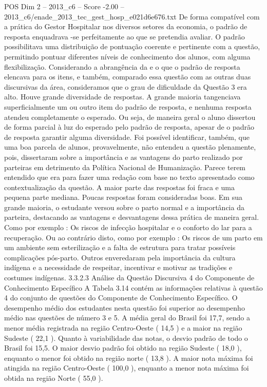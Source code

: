 \begin{textsample}{POS Dim 2 – 2013\_c6 – Score -2.00 – 2013\_c6/enade\_2013\_tec\_gest\_hosp\_e021d6e676.txt}
De forma compatível com a prática do Gestor Hospitalar nos diversos setores da economia, o padrão de resposta enquadrava -se perfeitamente ao que se pretendia avaliar.
O padrão possibilitava uma distribuição de pontuação coerente e pertinente com a questão, permitindo pontuar diferentes níveis de conhecimento dos alunos, com alguma flexibilização.
Considerando a abrangência da e o que o padrão de resposta elencava para os itens, e também, comparado essa questão com as outras duas discursivas da área, consideramos que o grau de dificuldade da Questão 3 era alto.
Houve grande diversidade de respostas.
A grande maioria tangenciava superficialmente um ou outro item do padrão de resposta, e nenhuma resposta atendeu completamente o esperado.
Ou seja, de maneira geral o aluno dissertou de forma parcial à luz do esperado pelo padrão de resposta, apesar de o padrão de resposta garantir alguma diversidade.
Foi possível identificar, também, que uma boa parcela de alunos, provavelmente, não entendeu a questão plenamente, pois, dissertaram sobre a importância e as vantagens do parto realizado por parteiras em detrimento da Política Nacional de Humanização.
Parece terem entendido que era para fazer uma redação com base no texto apresentado como contextualização da questão.
A maior parte das respostas foi fraca e uma pequena parte mediana.
Poucas respostas foram consideradas boas.
Em sua grande maioria, o estudante versou sobre o parto normal e a importância da parteira, destacando as vantagens e desvantagens dessa prática de maneira geral.
Como por exemplo : Os riscos de infecção hospitalar e o conforto do lar para a recuperação.
Ou ao contrário disto, como por exemplo : Os riscos de um parto em um ambiente sem esterilização e a falta de estrutura para tratar possíveis complicações pós-parto.
Outros enveredaram pela importância da cultura indígena e a necessidade de respeitar, incentivar e motivar as tradições e costumes indígenas. 3.3.2.3 Análise da Questão Discursiva 4 do Componente de Conhecimento Específico A Tabela 3.14 contém as informações relativas à questão 4 do conjunto de questões do Componente de Conhecimento Específico.
O desempenho médio dos estudantes nesta questão foi superior ao desempenho médio nas questões de número 3 e 5.
A média geral do Brasil foi 17,7, sendo a menor média registrada na região Centro-Oeste ( 14,5 ) e a maior na região Sudeste ( 22,1 ).
Quanto à variabilidade das notas, o desvio padrão de todo o Brasil foi 15,5.
O maior desvio padrão foi obtido na região Sudeste ( 18,0 ), enquanto o menor foi obtido na região norte ( 13,8 ).
A maior nota máxima foi atingida na região Centro-Oeste ( 100,0 ), enquanto a menor nota máxima foi obtida na região Norte ( 55,0 ).

\end{textsample}
